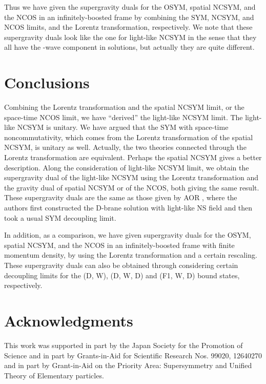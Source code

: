 \documentclass[a4paper,12pt]{article}
\providecommand{\sect}[1]{\setcounter{equation}{0}\section{#1}}
\begin{document}
Thus we have given the supergravity duals for the OSYM, spatial NCSYM, and
the NCOS in an infinitely-boosted frame by combining the SYM, NCSYM, and
NCOS limits, and the Lorentz transformation, respectively. We note that these
supergravity duals look like the one for light-like NCSYM in the sense that
they all have the \coordHE{}-wave component in solutions, but actually they are
quite different.


\sect{Conclusions}

Combining the Lorentz transformation and the spatial NCSYM limit, or the
space-time NCOS limit, we have ``derived'' the light-like NCSYM limit.
The light-like NCSYM is unitary. We have argued that the SYM with space-time
noncommutativity, which comes from the Lorentz transformation of the
spatial NCSYM, is unitary as well. Actually, the two theories
connected through the Lorentz transformation are equivalent. Perhaps the
spatial NCSYM gives a better description. Along the consideration
of light-like NCSYM limit, we obtain the supergravity dual
of the light-like NCSYM using the Lorentz transformation and the gravity
dual of spatial NCSYM or of the NCOS, both giving the same result.
These supergravity duals are the same as those given by
AOR \cite{AOR}, where the authors first constructed the D\coordHE{}-brane solution
with light-like NS \coordHE{} field and then took a usual SYM decoupling limit.

In addition, as a comparison, we have given supergravity duals for
the OSYM, spatial NCSYM, and the NCOS in an
infinitely-boosted frame with finite momentum density, by using the
Lorentz transformation and a certain rescaling. These supergravity
duals can also be obtained through considering certain decoupling limits
for the (D\coordHE{}, W), (D\coordHE{}, W, D\coordHE{}) and (F1, W, D\coordHE{}) bound states,
respectively.


\section*{Acknowledgments}


This work was supported in part by the Japan Society for the Promotion of
Science and in part by Grants-in-Aid for Scientific Research
Nos. 99020, 12640270 and in part by Grant-in-Aid on the Priority Area:
Supersymmetry and Unified Theory of Elementary particles.
\end{document}
